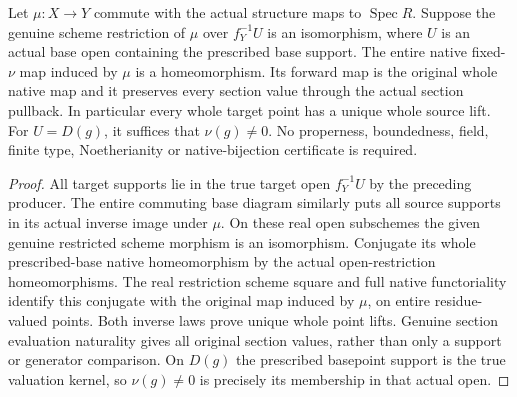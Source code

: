 \begin{theorem}
\label{scheme:native-base-open-modification}
\leanok
{}
Let $\mu:X\to Y$ commute with the actual structure maps to
$\operatorname{Spec}R$. Suppose the genuine scheme restriction of
$\mu$ over $f_Y^{-1}U$ is an isomorphism, where $U$ is an actual base
open containing the prescribed base support. The entire native
fixed-$\nu$ map induced by $\mu$ is a homeomorphism. Its forward map
is the original whole native map and it preserves every section value
through the actual section pullback. In particular every whole target
point has a unique whole source lift. For $U=D(g)$, it suffices that
$\nu(g)\ne0$. No properness, boundedness, field, finite type,
Noetherianity or native-bijection certificate is required.
\end{theorem}
\begin{proof}
All target supports lie in the true target open $f_Y^{-1}U$ by the
preceding producer. The entire commuting base diagram similarly puts
all source supports in its actual inverse image under $\mu$. On these
real open subschemes the given genuine restricted scheme morphism is
an isomorphism. Conjugate its whole prescribed-base native homeomorphism
by the actual open-restriction homeomorphisms. The real restriction
scheme square and full native functoriality identify this conjugate
with the original map induced by $\mu$, on entire residue-valued
points. Both inverse laws prove unique whole point lifts. Genuine
section evaluation naturality gives all original section values,
rather than only a support or generator comparison. On $D(g)$ the
prescribed basepoint support is the true valuation kernel, so
$\nu(g)\ne0$ is precisely its membership in that actual open.
\end{proof}

